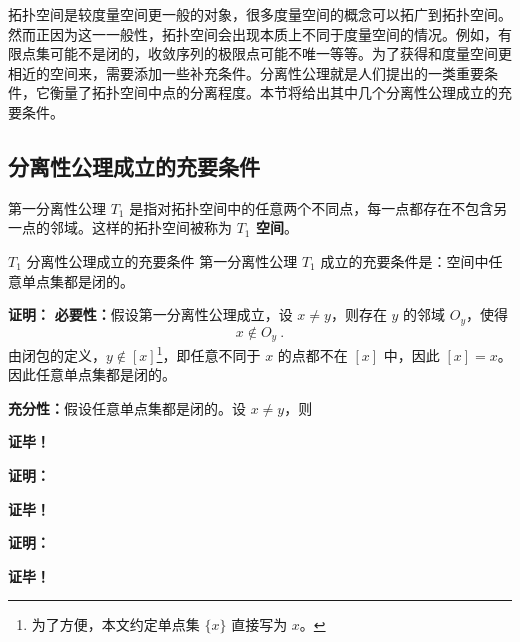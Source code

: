
拓扑空间是较度量空间更一般的对象，很多度量空间的概念可以拓广到拓扑空间。然而正因为这一一般性，拓扑空间会出现本质上不同于度量空间的情况。例如，有限点集可能不是闭的，收敛序列的极限点可能不唯一等等。为了获得和度量空间更相近的空间来，需要添加一些补充条件。分离性公理就是人们提出的一类重要条件，它衡量了拓扑空间中点的分离程度。本节将给出其中几个分离性公理成立的充要条件。

\subsection{分离性公理成立的充要条件}
第一分离性公理 $T_1$ 是指对拓扑空间中的任意两个不同点，每一点都存在不包含另一点的邻域。这样的拓扑空间被称为\textbf{ $T_1$ 空间}。
\begin{theorem}{$T_1$ 分离性公理成立的充要条件}
第一分离性公理 $T_1$ 成立的充要条件是：空间中任意单点集都是闭的。
\end{theorem}
\textbf{证明：}
\textbf{必要性：}假设第一分离性公理成立，设 $x\neq y$，则存在 $y$ 的邻域 $O_y$，使得
\begin{equation}
x\notin O_y~.
\end{equation}
由闭包的定义，$y\notin [x]$\footnote{为了方便，本文约定单点集 $\{x\}$ 直接写为 $x$。}，即任意不同于 $x$ 的点都不在 $[x]$ 中，因此 $[x]=x$。因此任意单点集都是闭的。

\textbf{充分性：}假设任意单点集都是闭的。设 $x\neq y$，则

\textbf{证毕！}







\textbf{证明：}


\textbf{证毕！}









\textbf{证明：}


\textbf{证毕！}




